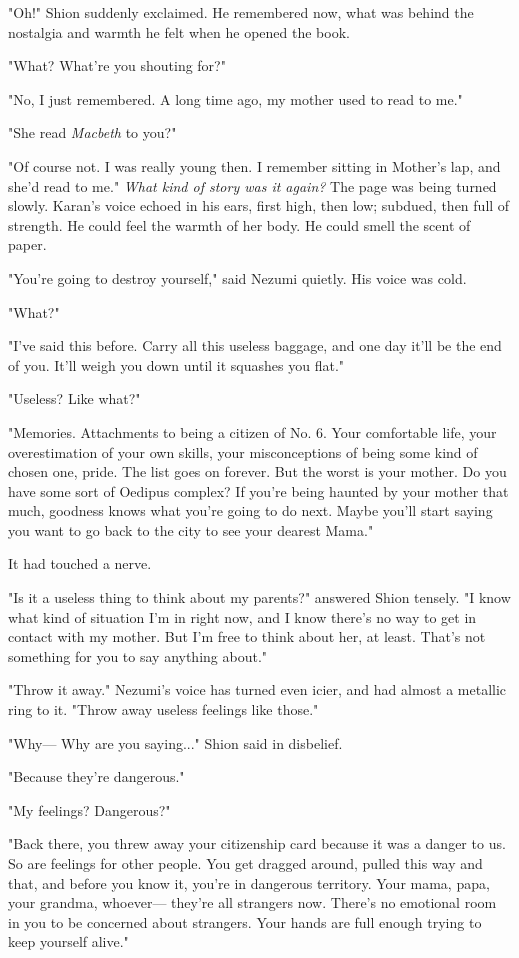 "Oh!" Shion suddenly exclaimed. He remembered now, what was behind the
nostalgia and warmth he felt when he opened the book.

"What? What're you shouting for?"

"No, I just remembered. A long time ago, my mother used to read to me."

"She read \emph{Macbeth} to you?"

"Of course not. I was really young then. I remember sitting in Mother's
lap, and she'd read to me." \emph{What kind of story was it again?} The page
was being turned slowly. Karan's voice echoed in his ears, first high,
then low; subdued, then full of strength. He could feel the warmth of
her body. He could smell the scent of paper.

"You're going to destroy yourself," said Nezumi quietly. His voice was
cold.

"What?"

"I've said this before. Carry all this useless baggage, and one day
it'll be the end of you. It'll weigh you down until it squashes you
flat."

"Useless? Like what?"

"Memories. Attachments to being a citizen of No. 6. Your comfortable
life, your overestimation of your own skills, your misconceptions of
being some kind of chosen one, pride. The list goes on forever. But the
worst is your mother. Do you have some sort of Oedipus complex? If
you're being haunted by your mother that much, goodness knows what
you're going to do next. Maybe you'll start saying you want to go back
to the city to see your dearest Mama."

It had touched a nerve.

"Is it a useless thing to think about my parents?" answered Shion
tensely. "I know what kind of situation I'm in right now, and I know
there's no way to get in contact with my mother. But I'm free to think
about her, at least. That's not something for you to say anything
about."

"Throw it away." Nezumi's voice has turned even icier, and had almost a
metallic ring to it. "Throw away useless feelings like those."

"Why--- Why are you saying..." Shion said in disbelief.

"Because they're dangerous."

"My feelings? Dangerous?"

"Back there, you threw away your citizenship card because it was a
danger to us. So are feelings for other people. You get dragged around,
pulled this way and that, and before you know it, you're in dangerous
territory. Your mama, papa, your grandma, whoever--- they're all strangers
now. There's no emotional room in you to be concerned about strangers.
Your hands are full enough trying to keep yourself alive."

